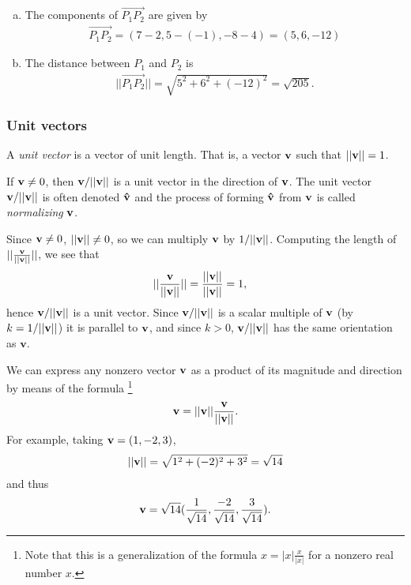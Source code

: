 \documentclass[12pt,letterpaper,reqno]{article}
\numberwithin{equation}{section}
\newcommand{\ti}[1]{\textit{#1}}
\begin{document}
{\color{red}  
\begin{enumerate}[(a)]
	\item The components of $\overrightarrow{P_1P_2}$ are given by
	\begin{align*}
		\overrightarrow{P_1P_2}=(7-2,5-(-1),-8-4)=(5,6,-12)
	\end{align*}
	\item The distance between $P_1$ and $P_2$ is 
	\begin{align*}
		||\overrightarrow{P_1P_2}||=\sqrt{5^2+6^2+(-12)^2}=\sqrt{205}.
	\end{align*}
\end{enumerate}}

\subsubsection{Unit vectors}
\begin{defn}
	A \emph{unit vector} is a vector of unit length. That is, a vector ${\bf v}$ such that $||{\bf v}||=1$.
\end{defn}

\begin{prop}
	If ${\bf v}\neq 0$, then ${\bf v}/||{\bf v}||$ is a unit vector in the direction of ${\bf v}$. The unit vector ${\bf v}/||{\bf v}||$ is often denoted ${\bf \hat{v}}$ and the process of forming ${\bf \hat{v}}$ from ${\bf v}$ is called \ti{normalizing} ${\bf v}$.
\end{prop}

\begin{pf}
Since ${\bf v}\neq 0$, $||{\bf v}|| \neq 0$, so we can multiply ${\bf v}$ by $1/||{\bf v}||$. Computing the length of $||\frac{{\bf v}}{||{\bf v}||}||$, we see that 
\begin{align*}
	||\frac{{\bf v}}{||{\bf v}||}||&=\frac{||{\bf v}||}{||{\bf v}||}=1,
\end{align*} 
hence ${\bf v}/||{\bf v}||$ is a unit vector. Since ${\bf v}/||{\bf v}||$ is a scalar multiple of ${\bf v}$ (by $k=1/||{\bf v}||$) it is parallel to ${\bf v}$, and since $k>0$, ${\bf v}/||{\bf v}||$ has the same orientation as $\mathbf{v}$.
\end{pf}

\begin{example}
	We can express any nonzero vector ${\bf v}$ as a product of its magnitude and direction by means of the formula \footnote{Note that this is a generalization of the formula $x=|x|\frac{x}{|x|}$ for a nonzero real number $x$.}
	\begin{align*}
		{\bf v}=||{\bf v}||\frac{{\bf v}}{||{\bf v}||}.
	\end{align*}
	For example, taking ${\bf v}=(1,-2,3)$,
	\begin{align*}
		||{\bf v}||=\sqrt{1^2+(-2)^2+3^2}=\sqrt{14}
	\end{align*}
	and thus
	\begin{align*}
		{\bf v}=\sqrt{14}(\frac{1}{\sqrt{14}},\frac{-2}{\sqrt{14}},\frac{3}{\sqrt{14}}).
	\end{align*}
\end{example}
\end{document}
